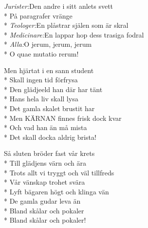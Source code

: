\begin{SongText}
\begin{SongVerse}
        \textit{Jurister:}\hspace{10,5mm}Den andre i sitt anlets svett\\*
        \hspace{21mm}På paragrafer vränge\\*
        \textit{Teologer:}\hspace{9,5mm}En plåstrar själen som är skral\\*
        \textit{Medicinare:}\hspace{4,6mm}En lappar hop dess trasiga fodral\\*
        \textit{Alla:}\hspace{14,3mm}O jerum, jerum, jerum\\*
        \hspace{21mm}O quae mutatio rerum!
    \end{SongVerse}
    \begin{SongVerse}
        Men hjärtat i en sann student\\*
        Skall ingen tid förfrysa\\*
        Den glädjeeld han där har tänt\\*
        Hans hela liv skall lysa\\*
        Det gamla skalet brustit har\\*
        Men KÄRNAN finnes frisk dock kvar\\*
        Och vad han än må mista\\*
        Det skall docka aldrig brista!
    \end{SongVerse}
    \begin{SongVerse}
        Så sluten bröder fast vår krets\\*
        Till glädjens värn och ära\\*
        Trots allt vi tryggt och väl tillfreds\\*
        Vår vänskap trohet svära\\*
        Lyft bägaren högt och klinga vän\\*
        De gamla gudar leva än\\*
        Bland skålar och pokaler\\*
        Bland skålar och pokaler!
    \end{SongVerse}
\end{SongText}


%
%
%
%
%
%
%
\newpage